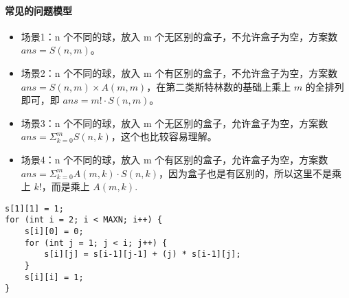 \paragraph{常见的问题模型}
\begin{itemize}
    \item 场景1：n 个不同的球，放入 m 个无区别的盒子，不允许盒子为空，方案数 $ans = S(n, m)$。
    \item 场景2：n 个不同的球，放入 m 个有区别的盒子，不允许盒子为空，方案数 $ans = S(n, m) \times A(m, m)$，在第二类斯特林数的基础上乘上 $m$ 的全排列即可，即 $ans = m! \cdot S(n, m)$。
    \item 场景3：n 个不同的球，放入 m 个无区别的盒子，允许盒子为空，方案数 $ans = \Sigma_{k=0}^{m}S(n, k)$，这个也比较容易理解。
    \item 场景4：n 个不同的球，放入 m 个有区别的盒子，允许盒子为空，方案数 $ans = \Sigma_{k=0}^{m} A(m, k) \cdot S(n, k)$，因为盒子也是有区别的，所以这里不是乘上 $k!$，而是乘上 $A(m, k)$.
\end{itemize}
\begin{verbatim}
s[1][1] = 1;
for (int i = 2; i < MAXN; i++) {
    s[i][0] = 0;
    for (int j = 1; j < i; j++) {
        s[i][j] = s[i-1][j-1] + (j) * s[i-1][j];
    }
    s[i][i] = 1;
}
\end{verbatim}
